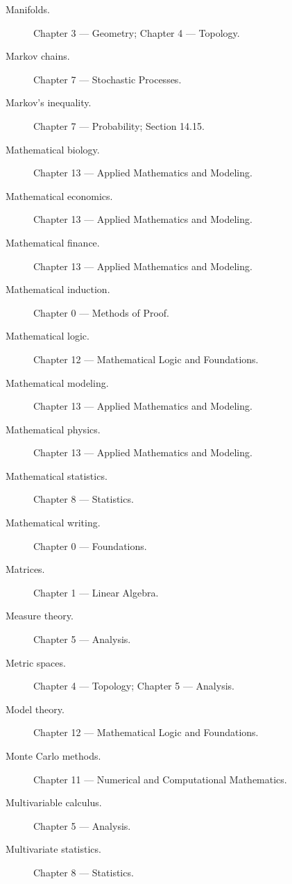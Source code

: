\begin{description}

\item[Manifolds.]
Chapter 3 --- Geometry;
Chapter 4 --- Topology.

\item[Markov chains.]
Chapter 7 --- Stochastic Processes.

\item[Markov's inequality.]
Chapter 7 --- Probability;
Section 14.15.

\item[Mathematical biology.]
Chapter 13 --- Applied Mathematics and Modeling.

\item[Mathematical economics.]
Chapter 13 --- Applied Mathematics and Modeling.

\item[Mathematical finance.]
Chapter 13 --- Applied Mathematics and Modeling.

\item[Mathematical induction.]
Chapter 0 --- Methods of Proof.

\item[Mathematical logic.]
Chapter 12 --- Mathematical Logic and Foundations.

\item[Mathematical modeling.]
Chapter 13 --- Applied Mathematics and Modeling.

\item[Mathematical physics.]
Chapter 13 --- Applied Mathematics and Modeling.

\item[Mathematical statistics.]
Chapter 8 --- Statistics.

\item[Mathematical writing.]
Chapter 0 --- Foundations.

\item[Matrices.]
Chapter 1 --- Linear Algebra.

\item[Measure theory.]
Chapter 5 --- Analysis.

\item[Metric spaces.]
Chapter 4 --- Topology;
Chapter 5 --- Analysis.

\item[Model theory.]
Chapter 12 --- Mathematical Logic and Foundations.

\item[Monte Carlo methods.]
Chapter 11 --- Numerical and Computational Mathematics.

\item[Multivariable calculus.]
Chapter 5 --- Analysis.

\item[Multivariate statistics.]
Chapter 8 --- Statistics.

\end{description}

